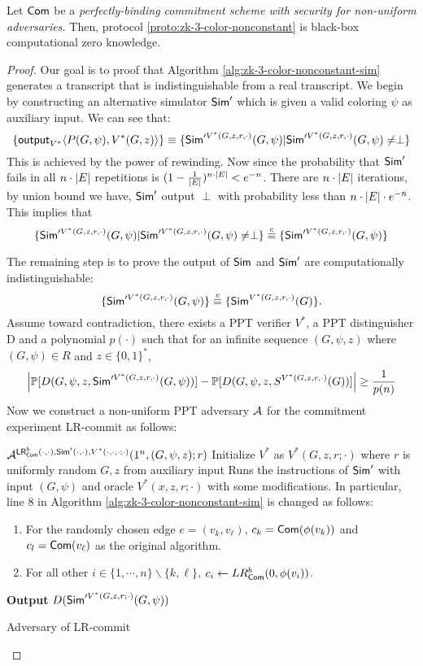 \begin{theorem}
Let ${\sf Com}$ be a {\it perfectly-binding commitment scheme with security for non-uniform adversaries.} Then, protocol \ref{proto:zk-3-color-nonconstant} is black-box computational zero knowledge.
\end{theorem}
\begin{proof}
Our goal is to proof that Algorithm \ref{alg:zk-3-color-nonconstant-sim} generates a transcript that is indistinguishable from a real transcript. We begin by constructing an alternative simulator ${\sf Sim}'$ which is given a valid coloring $\psi$ as auxiliary input. We can see that:
$$\{{\sf output}_{V^*}\langle P(G,\psi),V^*(G,z) \rangle \}\equiv\{{\sf Sim}'^{V^*(G,z,r,\cdot)}(G,\psi)|{\sf Sim}'^{V^*(G,z,r,\cdot)}(G,\psi)\neq\perp\}$$
This is achieved by the power of rewinding. Now since the probability that ${\sf Sim}'$ fails in all $n\cdot\left|E\right|$ repetitions is $(1-\frac{1}{\left|E\right|})^{n\cdot\left|E\right|}<e^{-n}$. There are $n\cdot\left|E\right|$ iterations, by union bound we have, ${\sf Sim}'$ output $\perp$ with probability less than $n\cdot\left|E\right|\cdot e^{-n}$. This implies that
$$\{{\sf Sim}'^{V^*(G,z,r,\cdot)}(G,\psi)|{\sf Sim}'^{V^*(G,z,r,\cdot)}(G,\psi)\neq\perp\}\stackrel{c}{\equiv}\{{\sf Sim}'^{V^*(G,z,r,\cdot)}(G,\psi)\}$$

The remaining step is to prove the output of ${\sf Sim}$ and ${\sf Sim}'$ are computationally indistinguishable:
$$\{{\sf Sim}'^{V^*(G,z,r,\cdot)}(G,\psi)\}\stackrel{c}{\equiv}\{{\sf Sim}^{V^*(G,z,r,\cdot)}(G)\}.$$
Assume toward contradiction, there exists a PPT verifier $V^*$, a PPT distinguisher D and a polynomial $p(\cdot)$ such that for an infinite sequence $(G,\psi,z)$ where $(G,\psi)\in R$ and $z\in\{0,1\}^*$,
$$\left|\mathop{\mathbb P\/}[D(G,\psi,z,{\sf Sim}'^{V^*(G,z,r,\cdot)}(G,\psi))]-\mathop{\mathbb P\/}[D(G,\psi,z,S^{V^*(G,z,r,\cdot)}(G))]\right|\geq\frac{1}{p(n)}$$
Now we construct a non-uniform PPT adversary $\mathcal{A}$ for the commitment experiment {\sf LR-commit} as follows:
\begin{algorithm}
$\mathcal{A}^{{\sf LR}^b_{{\sf Com}}(\cdot,\cdot),{\sf Sim}'(\cdot,\cdot),V^*(\cdot,\cdot,\cdot;\cdot)}(1^n,(G,\psi,z);r)$\;
Initialize $V^*$ as $V^*(G,z,r;\cdot)$ where $r$ is uniformly random $G,z$ from auxiliary input\;
Runs the instructions of ${\sf Sim}'$ with input $(G,\psi)$ and oracle $V^*(x,z,r;\cdot)$ with some modifications. In particular, line 8 in Algorithm \ref{alg:zk-3-color-nonconstant-sim} is changed as follows:
\begin{enumerate}
\item For the randomly chosen edge $e=(v_k,v_\ell)$, $c_k={\sf Com}(\phi(v_k))$ and $c_l={\sf Com}(v_\ell)$ as the original algorithm.
\item For all other $i\in\{1,\cdots,n\}\backslash\{k,\ell\}$, $c_i\gets LR^b_{\sf Com}(0,\phi(v_i))$.
\end{enumerate}
{\bf Output} $D({\sf Sim}'^{V^*(G,z,r;\cdot)}(G,\psi))$\;
\caption{Adversary of {\sf LR-commit}} \label{alg:zk-3-color-reduction}
\end{algorithm}


\end{proof}
